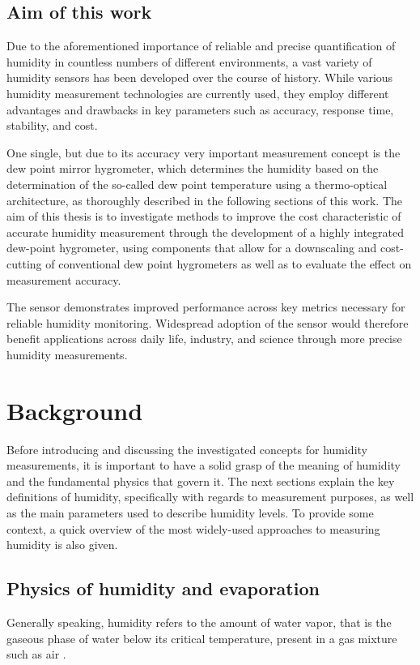 \section{Aim of this work}
Due to the aforementioned importance of reliable and precise quantification of humidity in countless numbers of different environments, a vast variety of humidity sensors has been developed over the course of history. While various humidity measurement technologies are currently used, they employ different advantages and drawbacks in key parameters such as accuracy, response time, stability, and cost. 

One single, but due to its accuracy very important measurement concept is the dew point mirror hygrometer, which determines the humidity based on the determination of the so-called dew point temperature using a thermo-optical architecture, as thoroughly described in the following sections of this work. The aim of this thesis is to investigate methods to improve the cost characteristic of accurate humidity measurement through the development of a highly integrated dew-point hygrometer, using components that allow for a downscaling and cost-cutting of conventional dew point hygrometers as well as to evaluate the effect on measurement accuracy. 

The sensor demonstrates improved performance across key metrics necessary for reliable humidity monitoring. Widespread adoption of the sensor would therefore benefit applications across daily life, industry, and science through more precise humidity measurements.


\chapter{Background}\label{s:background}
Before introducing and discussing the investigated concepts for humidity measurements, it is important to have a solid grasp of the meaning of humidity and the fundamental physics that govern it. The next sections explain the key definitions of humidity, specifically with regards to measurement purposes, as well as the main parameters used to describe humidity levels. To provide some context, a quick overview of the most widely-used approaches to measuring humidity is also given.

\section{Physics of humidity and evaporation}
Generally speaking, humidity refers to the amount of water vapor, that is the gaseous phase of water below its critical temperature, present in a gas mixture such as air \autocite{greenPerryChemicalEngineers2019}.

